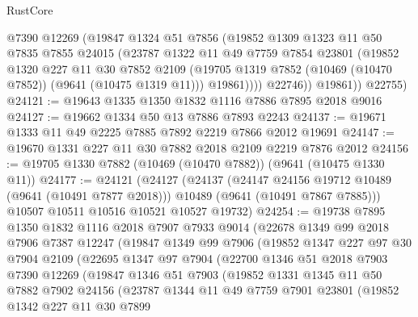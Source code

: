 \begin{lexlean}{RustCore}
\begin{coremodule}
              @7390
              @12269
              (@19847
                @1324
                @51
                @7856
                (@19852
                  @1309
                  @1323
                  @11
                  @50
                  @7835
                  @7855
                  @24015
                  (@23787
                    @1322
                    @11
                    @49
                    @7759
                    @7854
                    @23801
                    (@19852
                      @1320
                      @227
                      @11
                      @30
                      @7852
                      @2109
                      (@19705 @1319 @7852 (@10469 (@10470 @7852)) (@9641 (@10475 @1319 @11)))
                      @19861))))
              @22746))
          @19861))
      @22755)
@24121 := @19643 @1335 @1350 @1832 @1116 @7886 @7895 @2018 @9016
@24127 := @19662 @1334 @50 @13 @7886 @7893 @2243
@24137 := @19671 @1333 @11 @49 @2225 @7885 @7892 @2219 @7866 @2012 @19691
@24147 := @19670 @1331 @227 @11 @30 @7882 @2018 @2109 @2219 @7876 @2012
@24156 := @19705 @1330 @7882 (@10469 (@10470 @7882)) (@9641 (@10475 @1330 @11))
@24177 := @24121
    (@24127
      (@24137
        (@24147 @24156 @19712 @10489 (@9641 (@10491 @7877 @2018)))
        @10489
        (@9641 (@10491 @7867 @7885)))
      @10507
      @10511
      @10516
      @10521
      @10527
      @19732)
@24254 := @19738
    @7895
    @1350
    @1832
    @1116
    @2018
    @7907
    @7933
    @9014
    (@22678
      @1349
      @99
      @2018
      @7906
      @7387
      @12247
      (@19847
        @1349
        @99
        @7906
        (@19852
          @1347
          @227
          @97
          @30
          @7904
          @2109
          (@22695
            @1347
            @97
            @7904
            (@22700
              @1346
              @51
              @2018
              @7903
              @7390
              @12269
              (@19847
                @1346
                @51
                @7903
                (@19852
                  @1331
                  @1345
                  @11
                  @50
                  @7882
                  @7902
                  @24156
                  (@23787
                    @1344
                    @11
                    @49
                    @7759
                    @7901
                    @23801
                    (@19852
                      @1342
                      @227
                      @11
                      @30
                      @7899

\end{coremodule}
\end{lexlean}
